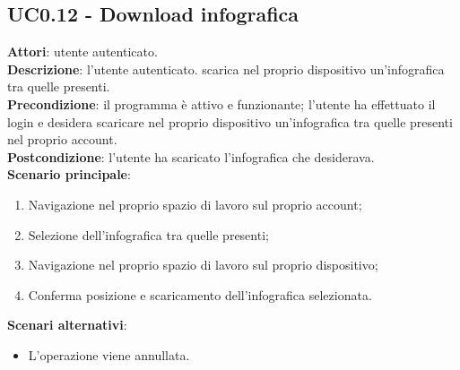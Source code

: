 \subsection{UC0.12 - Download infografica}{
	\label{uc0.12}
	\textbf{Attori}: utente autenticato.\\
	\textbf{Descrizione}: l'utente autenticato. scarica nel proprio dispositivo un'infografica tra quelle presenti.\\
	\textbf{Precondizione}: il programma è attivo e funzionante; l'utente ha effettuato il login e desidera scaricare nel proprio dispositivo un'infografica tra quelle presenti nel proprio account.	\\
	\textbf{Postcondizione}: l'utente ha scaricato l'infografica che desiderava.\\
	\textbf{Scenario principale}:
	\begin{enumerate}
		\item Navigazione nel proprio spazio di lavoro sul proprio account;
		\item Selezione dell'infografica tra quelle presenti;
		\item Navigazione nel proprio spazio di lavoro sul proprio dispositivo;
		\item Conferma posizione e scaricamento dell'infografica selezionata.
		\end{enumerate}	
	\textbf{Scenari alternativi}:
	\begin{itemize}
		\item L'operazione viene annullata.
	\end{itemize}
	}
